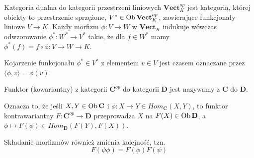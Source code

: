 \begin{example}
\item Kategoria dualna do kategorii przestrzeni liniowych $\mathbf{Vect}_K^{op}$ jest kategorią, której obiekty to przestrzenie sprzężone, $V^*\in\operatorname{Ob}\mathbf{Vect}^{op}_K$, zawierające funkcjonały liniowe $V\to K$. Każdy morfizm $\phi:V\to W$ w $\mathbf{Vect}_K$ indukuje wówczas odwzorowanie $\phi^*:W^*\to V^*$ takie, że dla $f\in W^*$ mamy $\phi^*(f)=f\circ\phi:V\to W\to K$.

  Kojarzenie funkcjonału $\phi^*\in V^*$ z elementem $v\in V$ jest czasem oznaczane przez $\langle \phi, v\rangle=\phi(v)$.
\end{example}

\begin{definition}
  Funktor (kowariantny) z kategorii $\mathbf{C}^{op}$ do kategorii $\mathbf{D}$ jest nazywamy  z $\mathbf{C}$ do $\mathbf{D}$.
\end{definition}

Oznacza to, że jeśli $X,Y\in\operatorname{Ob}\mathbf{C}$ i $\phi:X\to Y\in Hom_{\mathbf{C}}(X, Y)$, to funktor kontrawariantny $F:\mathbf{C}^{op}\to\mathbf{D}$ przeprowadza $X$ na $F(X)\in\operatorname{Ob}\mathbf{D}$, a $\phi\mapsto F(\phi)\in Hom_{\mathbf{D}}(F(Y),F(X))$.
\begin{center}\end{center}
Składanie morfizmów również zmienia kolejność, tzn.
$$F(\psi\phi)=F(\phi)F(\psi)$$









